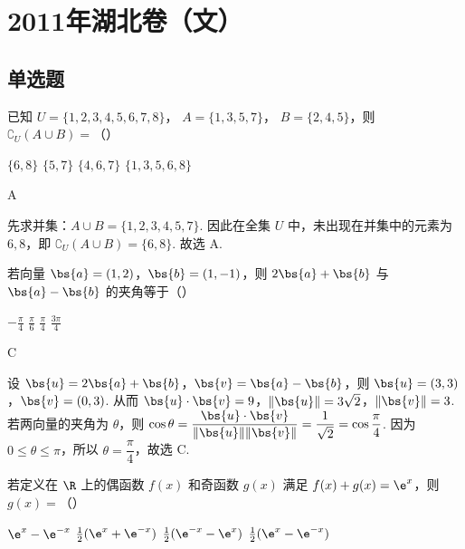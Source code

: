 \chapter{2011年湖北卷（文）}

\section{单选题}

\begin{problem}
已知 \( U = \{1, 2, 3, 4, 5, 6, 7, 8\} \)， \( A = \{1, 3, 5, 7\} \)， \( B = \{2, 4, 5\} \)，则 \( \complement_{U}(A \cup B) = \)（\quad）

\choices
    {\(\{6, 8\}\)}
    {\(\{5,7\}\)}
    {\( \{4, 6, 7\} \)}
    {\(\{1, 3, 5, 6, 8\}\)}
\end{problem}

\begin{answer}
A
\end{answer}

\begin{solution}
先求并集：\(A\cup B=\{1,2,3,4,5,7\}\). 因此在全集 \(U\) 中，未出现在并集中的元素为 \(6,8\)，即
\(\complement_U\left(A\cup B\right)=\{6,8\}\). 故选 A.
\end{solution}

\begin{problem}
若向量 \(\bs{a} = (1, 2)\)，\(\bs{b} = (1, -1)\)，则 \(2\bs{a} + \bs{b}\) 与 \(\bs{a} - \bs{b}\) 的夹角等于（\quad）

\choices
    {\(-\frac{\pi}{4}\)}
    {\( \frac{\pi}{6} \)}
    {\( \frac{\pi}{4} \)}
    {\(\frac{3\pi}{4}\)}
\end{problem}

\begin{answer}
C
\end{answer}

\begin{solution}
设 \(\bs{u}=2\bs{a}+\bs{b}\)，\(\bs{v}=\bs{a}-\bs{b}\)，则
\(\bs{u}=(3,3)\)，\(\bs{v}=(0,3)\). 从而 \(\bs{u}\cdot\bs{v}=9\)，\(\lVert\bs{u}\rVert=3\sqrt{2}\)，\(\lVert\bs{v}\rVert=3\). 若两向量的夹角为 \(\theta\)，则
\(\cos\theta=\dfrac{\bs{u}\cdot\bs{v}}{\lVert\bs{u}\rVert\lVert\bs{v}\rVert}=\dfrac{1}{\sqrt{2}}=\cos\dfrac{\pi}{4}\). 因为 \(0\leqslant\theta\leqslant\pi\)，所以 \(\theta=\dfrac{\pi}{4}\)，故选 C.
\end{solution}

\begin{problem}
若定义在 \(\R\) 上的偶函数 \(f(x)\) 和奇函数 \(g(x)\) 满足 \(f(x) + g(x) = \e^{x}\)，则 \(g(x) =\)（\quad）

\choices
    {\(\e^x - \e^{-x}\)}
    {\(\frac{1}{2} (\e^x + \e^{-x})\)}
    {\(\frac{1}{2} (\e^{-x} - \e^{x})\)}
    {\(\frac{1}{2} (\e^{x} - \e^{-x})\)}
\end{problem}

